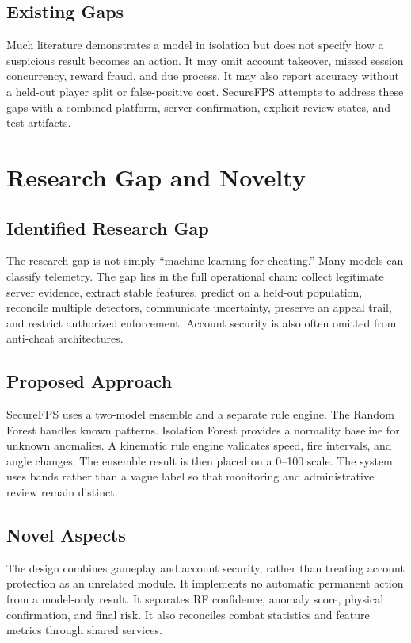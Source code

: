 \documentclass[12pt,a4paper,oneside]{report}
\begin{document}
\section{Existing Gaps}
Much literature demonstrates a model in isolation but does not specify how a suspicious result becomes an action. It may omit account takeover, missed session concurrency, reward fraud, and due process. It may also report accuracy without a held-out player split or false-positive cost. SecureFPS attempts to address these gaps with a combined platform, server confirmation, explicit review states, and test artifacts.

\chapter{Research Gap and Novelty}
\section{Identified Research Gap}
The research gap is not simply “machine learning for cheating.” Many models can classify telemetry. The gap lies in the full operational chain: collect legitimate server evidence, extract stable features, predict on a held-out population, reconcile multiple detectors, communicate uncertainty, preserve an appeal trail, and restrict authorized enforcement. Account security is also often omitted from anti-cheat architectures.

\section{Proposed Approach}
SecureFPS uses a two-model ensemble and a separate rule engine. The Random Forest handles known patterns. Isolation Forest provides a normality baseline for unknown anomalies. A kinematic rule engine validates speed, fire intervals, and angle changes. The ensemble result is then placed on a 0--100 scale. The system uses bands rather than a vague label so that monitoring and administrative review remain distinct.

\section{Novel Aspects}
The design combines gameplay and account security, rather than treating account protection as an unrelated module. It implements no automatic permanent action from a model-only result. It separates RF confidence, anomaly score, physical confirmation, and final risk. It also reconciles combat statistics and feature metrics through shared services.
\end{document}
